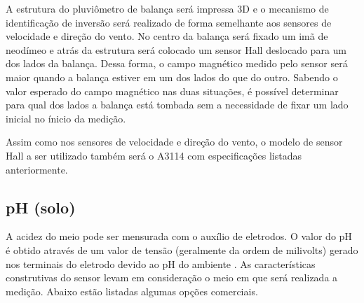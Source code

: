 	A estrutura do pluviômetro de balança será impressa 3D e o mecanismo de identificação de inversão será realizado de forma semelhante aos sensores de velocidade e direção do vento. No centro da balança será fixado um imã de neodímeo e atrás da estrutura será colocado um sensor Hall deslocado para um dos lados da balança. Dessa forma, o campo magnético medido pelo sensor será maior quando a balança estiver em um dos lados do que do outro. Sabendo o valor esperado do campo magnético nas duas situações, é possível determinar para qual dos lados a balança está tombada sem a necessidade de fixar um lado inicial no ínicio da medição.
	
	Assim como nos sensores de velocidade e direção do vento, o modelo de sensor Hall a ser utilizado também será o A3114 com especificações listadas anteriormente.

	

	\subsection{pH (solo)}
	
	A acidez do meio pode ser mensurada com o auxílio de eletrodos. O valor do pH é obtido através de um valor de tensão (geralmente da ordem de milivolts) gerado nos terminais do eletrodo devido ao pH do ambiente \cite{bib_sen_06_sigel}. As características construtivas do sensor levam em consideração o meio em que será realizada a medição. Abaixo estão listadas algumas opções comerciais.
	
